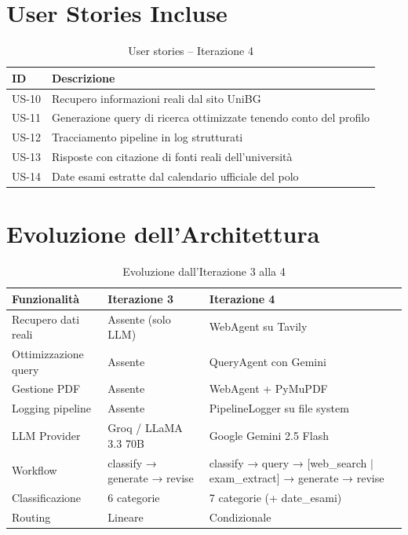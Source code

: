 \documentclass[a4paper,12pt]{report}
\begin{document}
\section{User Stories Incluse}

\begin{table}[H]
\centering
\begin{tabularx}{\textwidth}{l X}
\toprule
\textbf{ID} & \textbf{Descrizione} \\
\midrule
US-10 & Recupero informazioni reali dal sito UniBG \\
US-11 & Generazione query di ricerca ottimizzate tenendo conto del profilo \\
US-12 & Tracciamento pipeline in log strutturati \\
US-13 & Risposte con citazione di fonti reali dell'università \\
US-14 & Date esami estratte dal calendario ufficiale del polo \\
\bottomrule
\end{tabularx}
\caption{User stories -- Iterazione 4}
\end{table}

\section{Evoluzione dell'Architettura}

\begin{table}[H]
\centering
\small
\begin{tabularx}{\textwidth}{l X X}
\toprule
\textbf{Funzionalità} & \textbf{Iterazione 3} & \textbf{Iterazione 4} \\
\midrule
Recupero dati reali & Assente (solo LLM) & WebAgent su Tavily \\
Ottimizzazione query & Assente & QueryAgent con Gemini \\
Gestione PDF & Assente & WebAgent + PyMuPDF \\
Logging pipeline & Assente & PipelineLogger su file system \\
LLM Provider & Groq / LLaMA 3.3 70B & Google Gemini 2.5 Flash \\
Workflow & classify → generate → revise & classify → query → [web\_search $|$ exam\_extract] → generate → revise \\
Classificazione & 6 categorie & 7 categorie (+ date\_esami) \\
Routing & Lineare & Condizionale \\
\bottomrule
\end{tabularx}
\caption{Evoluzione dall'Iterazione 3 alla 4}
\end{table}
\end{document}
